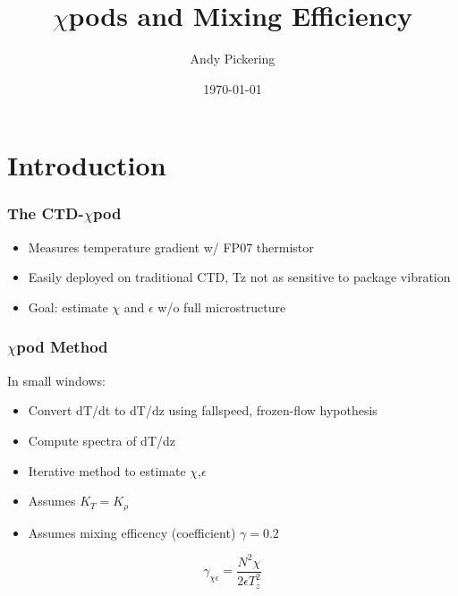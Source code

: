 \documentclass{beamer}
\title{$\chi$pods and Mixing Efficiency}
\author{Andy Pickering}
\date{\today}
\begin{document}
\frame{\titlepage}

\section[Outline]{}
\frame{\tableofcontents}


\section{Introduction}


\begin{frame}
 \frametitle{The CTD-$\chi$pod}

   \begin{itemize}
  \item Measures temperature gradient w/ FP07 thermistor
  \item Easily deployed on traditional CTD, Tz not as sensitive to package vibration
  \item Goal: estimate $\chi$ and $\epsilon$ w/o full microstructure
  \end{itemize}

\end{frame}


\begin{frame}
 \frametitle{$\chi$pod Method}

In small windows:
   \begin{itemize}
  \item Convert dT/dt to dT/dz using fallspeed, frozen-flow hypothesis
  \item  Compute spectra of dT/dz
  \item Iterative method to estimate $\chi$,$\epsilon$
  \item Assumes $K_T=K_{\rho}$
  \item Assumes mixing efficency (coefficient) $\gamma=0.2$
  \end{itemize}

\begin{equation}
\gamma_{\chi\epsilon}=\frac{N^2 \chi}{2\epsilon T_{z}^{2}} 
\end{equation}

\end{frame}
\end{document}
